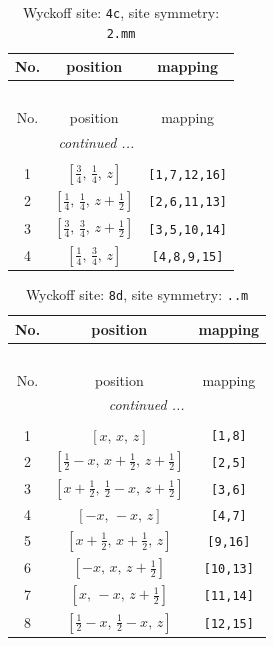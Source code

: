\documentclass[fleqn,8pt]{jsarticle}
\begin{document}
\renewcommand{\arraystretch}{1.2}
\begin{longtable}{ccc}
\caption{Wyckoff site: {\tt 4c}, site symmetry: {\tt 2.mm}}
 \\
 \hline \hline
No. & position & mapping \\ \hline \endfirsthead

\multicolumn{2}{l}{\tablename\ \thetable{}} \\
 \hline \hline
No. & position & mapping \\ \hline \endhead

 \hline \hline
\multicolumn{2}{r}{\footnotesize\it continued ...} \\ \endfoot

 \hline \hline
\multicolumn{2}{r}{} \\ \endlastfoot

1 & $\left[ \frac{3}{4},\, \frac{1}{4},\, z \right]$ & {\tt [1,7,12,16]} \\ \hline
2 & $\left[ \frac{1}{4},\, \frac{1}{4},\, z + \frac{1}{2} \right]$ & {\tt [2,6,11,13]} \\ \hline
3 & $\left[ \frac{3}{4},\, \frac{3}{4},\, z + \frac{1}{2} \right]$ & {\tt [3,5,10,14]} \\ \hline
4 & $\left[ \frac{1}{4},\, \frac{3}{4},\, z \right]$ & {\tt [4,8,9,15]} \\
\end{longtable}
\renewcommand{\arraystretch}{1.2}
\begin{longtable}{ccc}
\caption{Wyckoff site: {\tt 8d}, site symmetry: {\tt ..m}}
 \\
 \hline \hline
No. & position & mapping \\ \hline \endfirsthead

\multicolumn{2}{l}{\tablename\ \thetable{}} \\
 \hline \hline
No. & position & mapping \\ \hline \endhead

 \hline \hline
\multicolumn{2}{r}{\footnotesize\it continued ...} \\ \endfoot

 \hline \hline
\multicolumn{2}{r}{} \\ \endlastfoot

1 & $\left[ x,\, x,\, z \right]$ & {\tt [1,8]} \\ \hline
2 & $\left[ \frac{1}{2} - x,\, x + \frac{1}{2},\, z + \frac{1}{2} \right]$ & {\tt [2,5]} \\ \hline
3 & $\left[ x + \frac{1}{2},\, \frac{1}{2} - x,\, z + \frac{1}{2} \right]$ & {\tt [3,6]} \\ \hline
4 & $\left[ - x,\, - x,\, z \right]$ & {\tt [4,7]} \\ \hline
5 & $\left[ x + \frac{1}{2},\, x + \frac{1}{2},\, z \right]$ & {\tt [9,16]} \\ \hline
6 & $\left[ - x,\, x,\, z + \frac{1}{2} \right]$ & {\tt [10,13]} \\ \hline
7 & $\left[ x,\, - x,\, z + \frac{1}{2} \right]$ & {\tt [11,14]} \\ \hline
8 & $\left[ \frac{1}{2} - x,\, \frac{1}{2} - x,\, z \right]$ & {\tt [12,15]} \\
\end{longtable}
\end{document}
